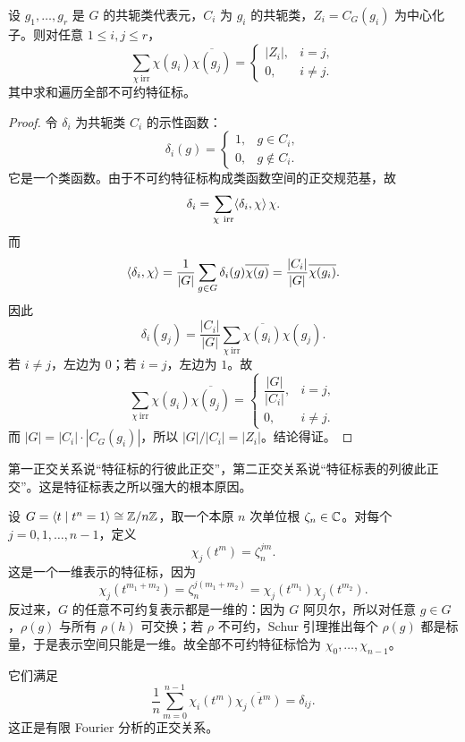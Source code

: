 \begin{theorem}[第二正交关系]
设 $g_1,\dots,g_r$ 是 $G$ 的共轭类代表元，$C_i$ 为 $g_i$ 的共轭类，$Z_i=C_G(g_i)$ 为中心化子。则对任意 $1\le i,j\le r$，
\[
\sum_{\chi\ \mathrm{irr}} \chi(g_i)\overline{\chi(g_j)}=
\begin{cases}
|Z_i|,& i=j,\\
0,& i\neq j.
\end{cases}
\]
其中求和遍历全部不可约特征标。
\end{theorem}

\begin{proof}
令 $\delta_i$ 为共轭类 $C_i$ 的示性函数：
\[
\delta_i(g)=
\begin{cases}
1,& g\in C_i,\\
0,& g\notin C_i.
\end{cases}
\]
它是一个类函数。由于不可约特征标构成类函数空间的正交规范基，故
\[
\delta_i=\sum_{\chi\ \mathrm{irr}} \langle \delta_i, \chi \rangle\,\chi.
\]
而
\[
\langle \delta_i, \chi \rangle
=\frac{1}{|G|}\sum_{g\in G}\delta_i(g)\overline{\chi(g)}
=\frac{|C_i|}{|G|}\overline{\chi(g_i)}.
\]
因此
\[
\delta_i(g_j)=\frac{|C_i|}{|G|}\sum_{\chi\ \mathrm{irr}}\overline{\chi(g_i)}\chi(g_j).
\]
若 $i\neq j$，左边为 $0$；若 $i=j$，左边为 $1$。故
\[
\sum_{\chi\ \mathrm{irr}}\chi(g_i)\overline{\chi(g_j)}=
\begin{cases}
\dfrac{|G|}{|C_i|},& i=j,\\
0,& i\neq j.
\end{cases}
\]
而 $|G|=|C_i|\cdot |C_G(g_i)|$，所以 $|G|/|C_i|=|Z_i|$。结论得证。
\end{proof}

\begin{remark}
第一正交关系说“特征标的行彼此正交”，第二正交关系说“特征标表的列彼此正交”。这是特征标表之所以强大的根本原因。
\end{remark}

\begin{example}
设 $G=\langle t\mid t^n=1\rangle\cong \mathbb{Z}/n\mathbb{Z}$，取一个本原 $n$ 次单位根 $\zeta_n\in \mathbb{C}$。对每个 $j=0,1,\dots,n-1$，定义
\[
\chi_j(t^m)=\zeta_n^{jm}.
\]
这是一个一维表示的特征标，因为
\[
\chi_j(t^{m_1+m_2})=\zeta_n^{j(m_1+m_2)}=
\chi_j(t^{m_1})\chi_j(t^{m_2}).
\]
反过来，$G$ 的任意不可约复表示都是一维的：因为 $G$ 阿贝尔，所以对任意 $g\in G$，$\rho(g)$ 与所有 $\rho(h)$ 可交换；若 $\rho$ 不可约，Schur 引理推出每个 $\rho(g)$ 都是标量，于是表示空间只能是一维。故全部不可约特征标恰为 $\chi_0,\dots,\chi_{n-1}$。

它们满足
\[
\frac{1}{n}\sum_{m=0}^{n-1}\chi_i(t^m)\overline{\chi_j(t^m)}=\delta_{ij}.
\]
这正是有限 Fourier 分析的正交关系。
\end{example}

